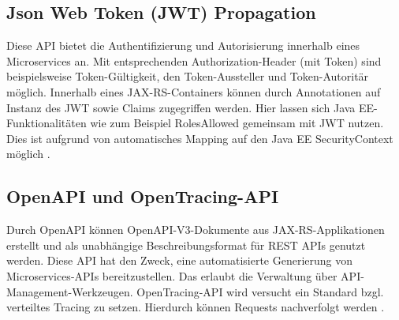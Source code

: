 \subsection{Json Web Token (JWT) Propagation}
Diese API bietet die Authentifizierung und Autorisierung innerhalb eines Microservices an. Mit entsprechenden Authorization-Header (mit Token) sind beispielsweise Token-Gültigkeit, den Token-Aussteller und Token-Autoritär möglich. Innerhalb eines JAX-RS-Containers können durch Annotationen auf Instanz des JWT sowie Claims zugegriffen werden. Hier lassen sich Java EE-Funktionalitäten wie zum Beispiel RolesAllowed gemeinsam mit JWT nutzen. Dies ist aufgrund von automatisches Mapping auf den Java EE SecurityContext möglich \cite{LarsRowekamp.2017b}. 


\subsection{OpenAPI und OpenTracing-API}
Durch OpenAPI können OpenAPI-V3-Dokumente aus JAX-RS-Applikationen erstellt und als unabhängige Beschreibungsformat für REST APIs genutzt werden. Diese API hat den Zweck, eine automatisierte Generierung von Microservices-APIs bereitzustellen. Das erlaubt die Verwaltung über API-Management-Werkzeugen.
OpenTracing-API wird versucht ein Standard bzgl. verteiltes Tracing zu setzen. Hierdurch können Requests nachverfolgt werden \cite{DominikMohilo2018}.  

